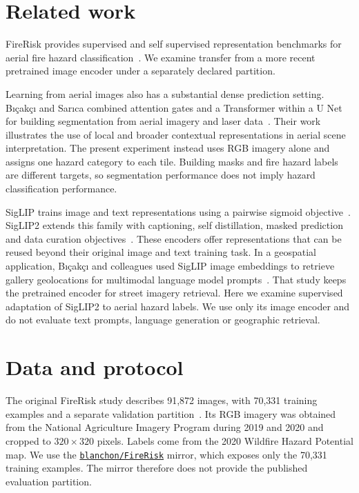 \documentclass[10pt,a4paper]{article}
\begin{document}
\section{Related work}

FireRisk provides supervised and self supervised representation benchmarks
for aerial fire hazard classification~\citep{shen2023firerisk}. We examine
transfer from a more recent pretrained image encoder under a separately
declared partition.

Learning from aerial images also has a substantial dense prediction setting.
Bıçakçı and Sarıca combined attention gates and a Transformer within a
U Net for building segmentation from aerial imagery and laser
data~\citep{bicakci2023attransunet}. Their work illustrates the use of local
and broader contextual representations in aerial scene interpretation.
The present experiment instead uses RGB imagery alone and assigns one
hazard category to each tile. Building masks and fire hazard labels are
different targets, so segmentation performance does not imply hazard
classification performance.

SigLIP trains image and text representations using a pairwise sigmoid
objective~\citep{zhai2023siglip}. SigLIP2 extends this family with captioning,
self distillation, masked prediction and data curation
objectives~\citep{tschannen2025siglip2}. These encoders offer representations
that can be reused beyond their original image and text training task.
In a geospatial application, Bıçakçı and colleagues used SigLIP image
embeddings to retrieve gallery geolocations for multimodal language model
prompts~\citep{bicakci2025geolocalization}. That study keeps the pretrained
encoder for street imagery retrieval. Here we examine supervised adaptation
of SigLIP2 to aerial hazard labels. We use only its image encoder and do
not evaluate text prompts, language generation or geographic retrieval.

\section{Data and protocol}

The original FireRisk study describes 91,872 images, with 70,331 training
examples and a separate validation partition~\citep{shen2023firerisk}. Its RGB
imagery was obtained from the National Agriculture Imagery Program during
2019 and 2020 and cropped to $320\times320$ pixels. Labels come from the
2020 Wildfire Hazard Potential map. We use the
\href{https://huggingface.co/datasets/blanchon/FireRisk}{\texttt{blanchon/FireRisk}}
mirror, which exposes only the 70,331 training examples. The mirror therefore
does not provide the published evaluation partition.
\end{document}
